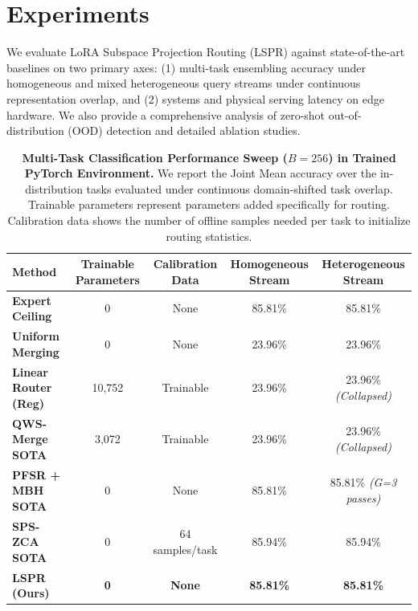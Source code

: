 \section{Experiments}
\label{sec:experiments}

We evaluate LoRA Subspace Projection Routing (LSPR) against state-of-the-art baselines on two primary axes: (1) multi-task ensembling accuracy under homogeneous and mixed heterogeneous query streams under continuous representation overlap, and (2) systems and physical serving latency on edge hardware. We also provide a comprehensive analysis of zero-shot out-of-distribution (OOD) detection and detailed ablation studies.

\begin{table}[t]
\caption{\textbf{Multi-Task Classification Performance Sweep ($B=256$) in Trained PyTorch Environment.} We report the Joint Mean accuracy over the in-distribution tasks evaluated under continuous domain-shifted task overlap. Trainable parameters represent parameters added specifically for routing. Calibration data shows the number of offline samples needed per task to initialize routing statistics.}
\label{tab:main_results}
\vskip 0.15in
\begin{center}
\begin{small}
\begin{tabular}{lcccc}
\toprule
\textbf{Method} & \textbf{Trainable Parameters} & \textbf{Calibration Data} & \textbf{Homogeneous Stream} & \textbf{Heterogeneous Stream} \\
\midrule
\textbf{Expert Ceiling} & 0 & None & 85.81\% & 85.81\% \\
\textbf{Uniform Merging} & 0 & None & 23.96\% & 23.96\% \\
\midrule
\textbf{Linear Router (Reg)} & 10,752 & Trainable & 23.96\% & 23.96\% \textit{(Collapsed)} \\
\textbf{QWS-Merge SOTA} & 3,072 & Trainable & 23.96\% & 23.96\% \textit{(Collapsed)} \\
\midrule
\textbf{PFSR + MBH SOTA} & 0 & None & 85.81\% & 85.81\% \textit{(G=3 passes)} \\
\textbf{SPS-ZCA SOTA} & 0 & 64 samples/task & 85.94\% & 85.94\% \\
\midrule
\textbf{LSPR (Ours)} & \textbf{0} & \textbf{None} & \textbf{85.81\%} & \textbf{85.81\%} \\
\bottomrule
\end{tabular}
\end{small}
\end{center}
\vskip -0.1in
\end{table}
